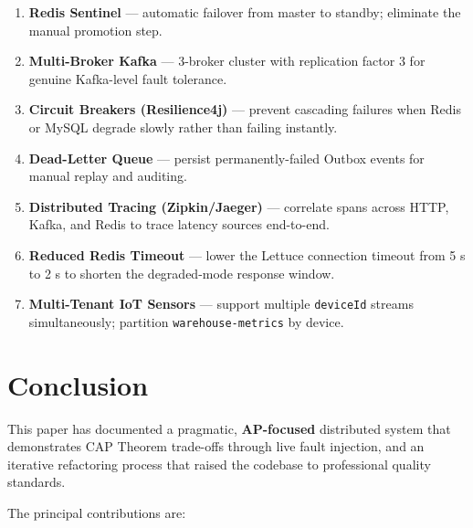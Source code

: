 \documentclass[12pt,a4paper,twoside]{article}
\begin{document}
\begin{enumerate}[leftmargin=1.8cm, label=\textbf{F\arabic*.}]
  \item \textbf{Redis Sentinel} — automatic failover from master to
        standby; eliminate the manual promotion step.
  \item \textbf{Multi-Broker Kafka} — 3-broker cluster with replication
        factor 3 for genuine Kafka-level fault tolerance.
  \item \textbf{Circuit Breakers (Resilience4j)} — prevent cascading
        failures when Redis or MySQL degrade slowly rather than failing
        instantly.
  \item \textbf{Dead-Letter Queue} — persist permanently-failed Outbox
        events for manual replay and auditing.
  \item \textbf{Distributed Tracing (Zipkin/Jaeger)} — correlate spans
        across HTTP, Kafka, and Redis to trace latency sources end-to-end.
  \item \textbf{Reduced Redis Timeout} — lower the Lettuce connection
        timeout from 5 s to 2 s to shorten the degraded-mode response
        window.
  \item \textbf{Multi-Tenant IoT Sensors} — support multiple \texttt{deviceId}
        streams simultaneously; partition \texttt{warehouse-metrics} by
        device.
\end{enumerate}

\section{Conclusion}
\label{sec:conclusion}

This paper has documented a pragmatic, \textbf{AP-focused} distributed
system that demonstrates CAP Theorem trade-offs through live fault
injection, and an iterative refactoring process that raised the codebase
to professional quality standards.

The principal contributions are:
\end{document}
